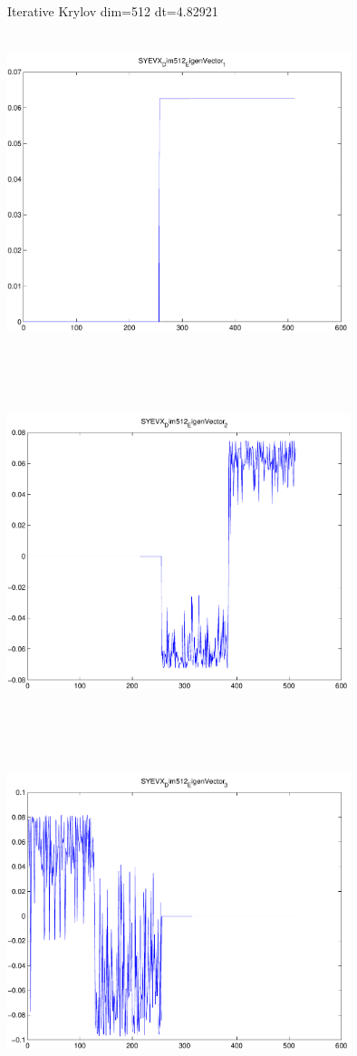 \documentclass[9pt]{article}
\theoremstyle{plain}
\theoremstyle{definition}
\theoremstyle{remark}
\numberwithin{equation}{section}
\begin{document}
Iterative Krylov dim=512 dt=4.82921
\includegraphics[width=10.0cm,height=10.0cm]{SYEVX_Dim512_EigenVector_1.pdf}

\includegraphics[width=10.0cm,height=10.0cm]{SYEVX_Dim512_EigenVector_2.pdf}

\includegraphics[width=10.0cm,height=10.0cm]{SYEVX_Dim512_EigenVector_3.pdf}
\end{document}
